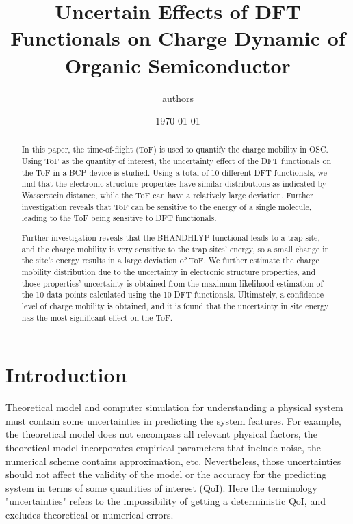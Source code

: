 \documentclass[letterpaper,12pt]{article}
\begin{document}
\linenumbers
\title{Uncertain Effects of DFT Functionals on Charge Dynamic of Organic Semiconductor }
\author{authors}
\date{\today}
\maketitle
\begin{abstract}
In this paper, the time-of-flight (ToF) is used to quantify the charge mobility in OSC. 
Using ToF as the quantity of interest, the uncertainty effect of the DFT functionals on the ToF in a BCP device is studied. 
Using a total of 10 different DFT functionals, we find that the electronic structure properties have similar distributions as indicated by Wasserstein distance, while the ToF can have a relatively large deviation.
Further investigation reveals that ToF can be sensitive to the energy of a single molecule, leading to the ToF being sensitive to DFT functionals.

Further investigation reveals that the BHANDHLYP functional leads to a trap site, and the charge mobility is very sensitive to the trap sites' energy, so a small change in the site's energy results in a large deviation of ToF.  
We further estimate the charge mobility distribution due to the uncertainty in electronic structure properties, and those properties' uncertainty is obtained from the maximum likelihood estimation of the 10 data points calculated using the 10 DFT functionals.
Ultimately, a confidence level of charge mobility is obtained, and it is found that the uncertainty in site energy has the most significant effect on the ToF. 
\end{abstract}

\section{Introduction}

Theoretical model and computer simulation for understanding a physical system must contain some uncertainties in predicting the system features. 
For example, the theoretical model does not encompass all relevant physical factors, the theoretical model incorporates empirical parameters that include noise, the numerical scheme contains approximation, etc.
Nevertheless, those uncertainties should not affect the validity of the model or the accuracy for the predicting system in terms of some quantities of interest (QoI). 
Here the terminology "uncertainties" refers to the impossibility of getting a deterministic QoI, and excludes theoretical or numerical errors. 
\end{document}
